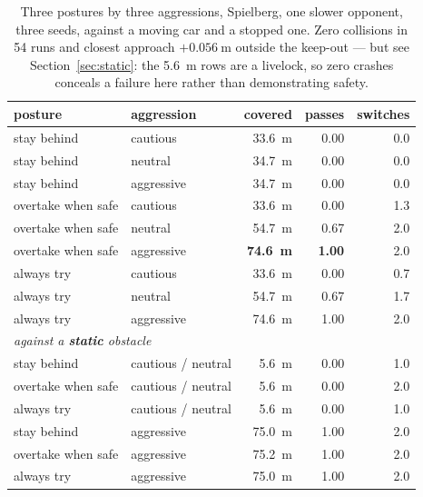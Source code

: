 \documentclass[letterpaper, 10 pt, conference]{ieeeconf}
\begin{document}
\begin{table}[t]
  \centering
  \caption{Three postures by three aggressions, Spielberg, one slower opponent,
  three seeds, against a moving car and a stopped one. Zero collisions in 54
  runs and closest approach $+\SI{0.056}{\meter}$ outside the keep-out --- but
  see Section~\ref{sec:static}: the \SI{5.6}{\meter} rows are a livelock, so
  zero crashes conceals a failure here rather than demonstrating safety.}
  \label{tab:behaviour}
  \begin{tabular}{llrrr}
    \toprule
    posture & aggression & covered & passes & switches \\
    \midrule
    stay behind        & cautious   & \SI{33.6}{\meter} & 0.00 & 0.0 \\
    stay behind        & neutral    & \SI{34.7}{\meter} & 0.00 & 0.0 \\
    stay behind        & aggressive & \SI{34.7}{\meter} & 0.00 & 0.0 \\
    overtake when safe & cautious   & \SI{33.6}{\meter} & 0.00 & 1.3 \\
    overtake when safe & neutral    & \SI{54.7}{\meter} & 0.67 & 2.0 \\
    overtake when safe & aggressive & \textbf{\SI{74.6}{\meter}} & \textbf{1.00} & 2.0 \\
    always try         & cautious   & \SI{33.6}{\meter} & 0.00 & 0.7 \\
    always try         & neutral    & \SI{54.7}{\meter} & 0.67 & 1.7 \\
    always try         & aggressive & \SI{74.6}{\meter} & 1.00 & 2.0 \\
    \midrule
    \multicolumn{5}{l}{\emph{against a \textbf{static} obstacle}} \\
    stay behind        & cautious / neutral & \SI{5.6}{\meter} & 0.00 & 1.0 \\
    overtake when safe & cautious / neutral & \SI{5.6}{\meter} & 0.00 & 2.0 \\
    always try         & cautious / neutral & \SI{5.6}{\meter} & 0.00 & 1.0 \\
    stay behind        & aggressive & \SI{75.0}{\meter} & 1.00 & 2.0 \\
    overtake when safe & aggressive & \SI{75.2}{\meter} & 1.00 & 2.0 \\
    always try         & aggressive & \SI{75.0}{\meter} & 1.00 & 2.0 \\
    \bottomrule
  \end{tabular}
\end{table}
\end{document}
